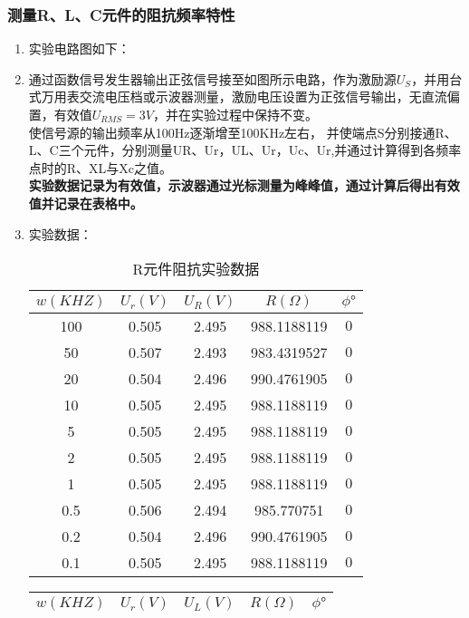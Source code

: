 \documentclass[dvipsnames, svgnames,a4paper,11pt]{article}
\begin{document}
	\subsubsection{测量R、L、C元件的阻抗频率特性}
	\begin{enumerate}
		\item 实验电路图如下：
		
		
		
		
		\item 通过函数信号发生器输出正弦信号接至如图所示电路，作为激励源$U_S$，并用台式万用表交流电压档或示波器测量，激励电压设置为正弦信号输出，无直流偏置，有效值$U_{RMS}=3V$，并在实验过程中保持不变。\\
		使信号源的输出频率从100Hz逐渐增至100KHz左右， 并使端点S分别接通R、L、C三个元件，分别测量UR、Ur，UL、Ur，Uc、Ur,并通过计算得到各频率点时的R、XL与Xc之值。
		\\\textbf{实验数据记录为有效值，示波器通过光标测量为峰峰值，通过计算后得出有效值并记录在表格中。}
		\item 实验数据：
		\begin{table}[h]
			\centering
			\begin{tabular}{|c|c|c|c|c|}
			\hline
			$w(KHZ)$ & $U_r(V)$ & $U_R(V)$ & $R(\Omega)$ & $\phi °$ \\
			\hline
			
			100   & 0.505 & 2.495 & 988.1188119 & $0 $\\
			\hline
			50  & 0.507 & 2.493 & 983.4319527 &$0 $\\
			\hline
			20   & 0.504 & 2.496 & 990.4761905 & $0 $\\
			\hline
			10  & 0.505 & 2.495 & 988.1188119 &$0 $ \\
			\hline
			5   & 0.505 & 2.495 & 988.1188119 &$0 $ \\
			\hline
			2   & 0.505 & 2.495 & 988.1188119 & $0 $\\
			\hline
			1   & 0.505 & 2.495 & 988.1188119 & $0 $\\
			\hline
			0.5   & 0.506 & 2.494 & 985.770751 & $0 $\\
			\hline
			0.2   & 0.504 & 2.496 & 990.4761905 & $0 $\\
			\hline
			0.1   & 0.505 & 2.495 &988.1188119 &$0 $ \\
			\hline
			
			\end{tabular}
			\caption{R元件阻抗实验数据}
			
			\end{table}
			\begin{table}[h]
				\centering
				\begin{tabular}{|c|c|c|c|c|}
				\hline
				$w(KHZ)$ & $U_r(V)$ & $U_L(V)$ & $R(\Omega)$ & $\phi °$ \\
				\hline
				

\end{tabular}
\end{table}
\end{enumerate}
\end{document}
